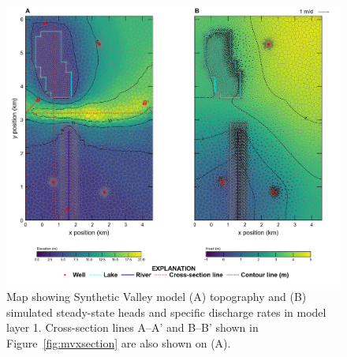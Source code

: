 \documentclass[11pt, oneside]{article}  	%
\begin{document}
\begin{figure}[ht!]
	\begin{center}
		\includegraphics{figures/mv_voronoi_map.png}
	\end{center}
	\caption{Map showing Synthetic Valley model (A) topography and (B) simulated steady-state heads and specific discharge rates in model layer 1. Cross-section lines A--A' and B--B' shown in Figure~\ref{fig:mvxsection} are also shown on (A).}
	\label{fig:mvmap}
\end{figure}
\end{document}
